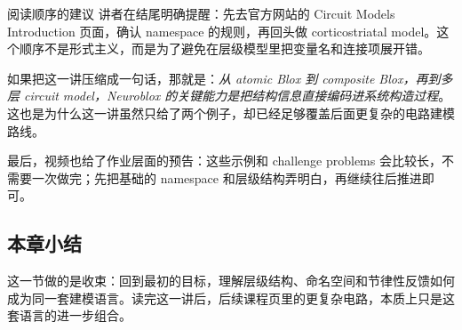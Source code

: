 \documentclass[a4paper]{article}
\begin{document}
\begin{warningbox}{阅读顺序的建议}
讲者在结尾明确提醒：先去官方网站的 Circuit Models \textrm{Introduction} 页面，确认 namespace 的规则，再回头做 corticostriatal model。这个顺序不是形式主义，而是为了避免在层级模型里把变量名和连接项展开错。
\end{warningbox}

如果把这一讲压缩成一句话，那就是：\emph{从 atomic Blox 到 composite Blox，再到多层 circuit model，Neuroblox 的关键能力是把结构信息直接编码进系统构造过程}。这也是为什么这一讲虽然只给了两个例子，却已经足够覆盖后面更复杂的电路建模路线。

最后，视频也给了作业层面的预告：这些示例和 challenge problems 会比较长，不需要一次做完；先把基础的 namespace 和层级结构弄明白，再继续往后推进即可。

\subsection{本章小结}
这一节做的是收束：回到最初的目标，理解层级结构、命名空间和节律性反馈如何成为同一套建模语言。读完这一讲后，后续课程页里的更复杂电路，本质上只是这套语言的进一步组合。
\end{document}
